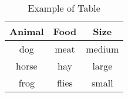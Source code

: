 \begin{table}[h!]
    \centering
    \caption{Example of Table} 
    \label{table:1}
    \begin{tabular}{ccc}
        \hline
        Animal & Food  & Size   \\
        \hline
        dog    & meat  & medium \\
        horse  & hay   & large  \\
        frog   & flies & small  \\
        \hline
    \end{tabular}
\end{table}
